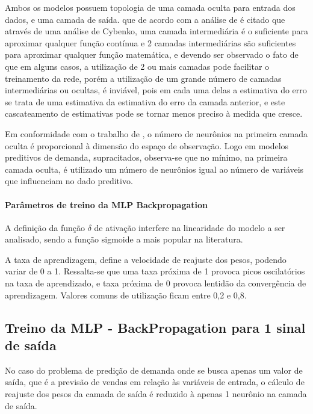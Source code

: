 \documentclass[	12pt, Times, openright, twoside, a4paper, english, brazil]{abntex2}
\begin{document}
            Ambos os modelos possuem topologia de uma camada oculta para entrada dos dados, e uma camada de saída. que de acordo com  a análise de\cite{Braga2000}  é citado que através de uma análise de Cybenko, uma camada intermediária é o suficiente para aproximar qualquer função contínua e 2 camadas intermediárias são suficientes para aproximar qualquer função matemática, e devendo ser observado o fato de que em alguns casos, a utilização de 2 ou mais camadas pode facilitar o treinamento da rede, porém a utilização de um grande número de camadas intermediárias ou ocultas, é inviável, pois em cada uma delas a estimativa do erro se trata de uma estimativa da estimativa do erro da camada anterior, e este cascateamento de estimativas pode se tornar menos preciso à medida que cresce.
            
          Em conformidade com o trabalho de  \cite{Flavia2014}, o número de neurônios na primeira camada oculta é proporcional à dimensão do espaço de observação. Logo em modelos preditivos de demanda, supracitados, observa-se que no mínimo, na primeira camada oculta, é utilizado um número de neurônios igual ao número de variáveis que influenciam no dado preditivo.
            
            \paragraph*{Parâmetros de treino da MLP Backpropagation}
            A definição da função $\delta$ de ativação interfere na linearidade  do modelo a ser analisado, sendo a função sigmoide a mais popular na literatura. 
            
            A taxa de aprendizagem, define a velocidade de reajuste dos pesos, podendo variar de 0 a 1. Ressalta-se que uma taxa próxima de 1 provoca picos oscilatórios na taxa de aprendizado, e taxa próxima de 0 provoca lentidão da convergência de aprendizagem. Valores comuns de utilização ficam entre 0,2 e 0,8.
        
        \subsection{Treino da MLP - BackPropagation para 1 sinal de saída}
            No caso do problema de predição de demanda onde se busca apenas um valor de saída, que é a previsão de vendas em relação às variáveis de entrada, o cálculo de reajuste dos pesos da camada de saída é reduzido à apenas 1 neurônio na camada de saída.
            
\end{document}
